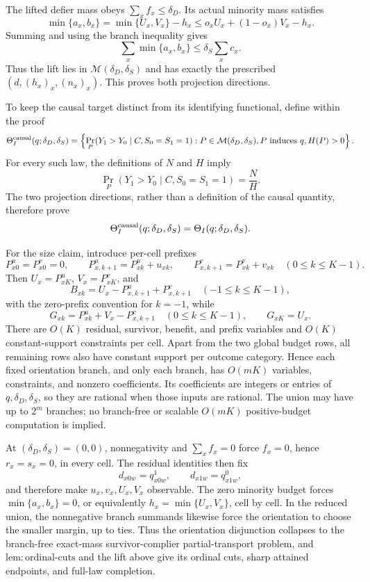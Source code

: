 The lifted defier mass obeys \(\sum_xf_x\leq\delta_D\). Its actual minority mass satisfies
\[
 \min\{a_x,b_x\}
 =\min\{U_x,V_x\}-h_x
 \leq o_xU_x+(1-o_x)V_x-h_x.
\]
Summing and using the branch inequality gives
\[
 \sum_x\min\{a_x,b_x\}
 \leq\delta_S\sum_xc_x.
\]
Thus the lift lies in \(\mathcal M(\delta_D,\delta_S)\) and has exactly the prescribed \((d,(h_x)_x,(n_x)_x)\). This proves both projection directions.

To keep the causal target distinct from its identifying functional, define within the proof
\[
 \Theta_I^{\rm causal}(q;\delta_D,\delta_S)
 =\left\{
 \Pr_P(Y_1>Y_0\mid C,S_0=S_1=1):
 P\in\mathcal M(\delta_D,\delta_S),
 P\text{ induces }q,
 H(P)>0
 \right\}.
\]
For every such law, the definitions of \(N\) and \(H\) imply
\[
 \Pr_P(Y_1>Y_0\mid C,S_0=S_1=1)=\frac NH.
\]
The two projection directions, rather than a definition of the causal quantity, therefore prove
\[
 \Theta_I^{\rm causal}(q;\delta_D,\delta_S)
 =\Theta_I(q;\delta_D,\delta_S).
\]

For the size claim, introduce per-cell prefixes
\[
 P^u_{x0}=P^v_{x0}=0,
 \qquad
 P^u_{x,k+1}=P^u_{xk}+u_{xk},
 \qquad
 P^v_{x,k+1}=P^v_{xk}+v_{xk}
 \quad(0\leq k\leq K-1).
\]
Then \(U_x=P^u_{xK}\), \(V_x=P^v_{xK}\), and
\[
 B_{xk}=U_x-P^u_{x,k+1}+P^v_{x,k+1}
 \quad(-1\leq k\leq K-1),
\]
with the zero-prefix convention for \(k=-1\), while
\[
 G_{xk}=P^u_{xk}+V_x-P^v_{x,k+1}
 \quad(0\leq k\leq K-1),
 \qquad
 G_{xK}=U_x.
\]
There are \(O(K)\) residual, survivor, benefit, and prefix variables and \(O(K)\) constant-support constraints per cell. Apart from the two global budget rows, all remaining rows also have constant support per outcome category. Hence each fixed orientation branch, and only each branch, has \(O(mK)\) variables, constraints, and nonzero coefficients. Its coefficients are integers or entries of \(q,\delta_D,\delta_S\), so they are rational when those inputs are rational. The union may have up to \(2^m\) branches; no branch-free or scalable \(O(mK)\) positive-budget computation is implied.

At \((\delta_D,\delta_S)=(0,0)\), nonnegativity and \(\sum_xf_x=0\) force \(f_x=0\), hence \(r_x=s_x=0\), in every cell. The residual identities then fix
\[
 d_{x0w}=q^1_{x0w},
 \qquad
 d_{x1w}=q^0_{x1w},
\]
and therefore make \(u_x,v_x,U_x,V_x\) observable. The zero minority budget forces \(\min\{a_x,b_x\}=0\), or equivalently \(h_x=\min\{U_x,V_x\}\), cell by cell. In the reduced union, the nonnegative branch summands likewise force the orientation to choose the smaller margin, up to ties. Thus the orientation disjunction collapses to the branch-free exact-mass survivor-complier partial-transport problem, and \(\mathrm{lem:ordinal\text{-}cuts}\) and the lift above give its ordinal cuts, sharp attained endpoints, and full-law completion.

